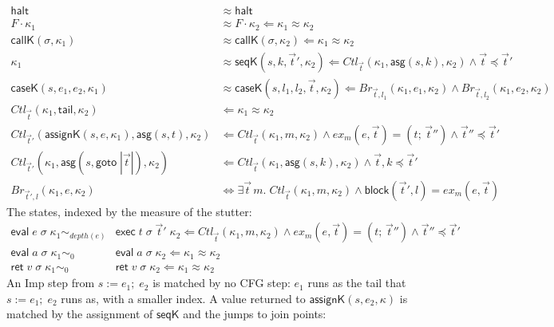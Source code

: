 \documentclass[10pt]{article}
\theoremstyle{acmplain}
\newcommand{\key}[1]{\mathsf{#1}}
\newcommand{\pass}[1]{\mathit{#1}}
\newcommand{\Kf}[2]{\key{#1}(#2)}
\newcommand{\halt}{\key{halt}}
\newcommand{\assign}[3]{#1 \mathrel{:=} #2;\; #3}
\newcommand{\evi}[3]{\key{eval}\;#1\;#2\;#3}
\newcommand{\rti}[3]{\key{ret}\;#1\;#2\;#3}
\newcommand{\exc}[4]{\key{exec}\;#1\;#2\;#3\;#4}
\begin{document}
\begin{align*}
  \halt &\approx \halt \\
  F \cdot \kappa_1 &\approx F \cdot \kappa_2 \Leftarrow \kappa_1 \approx \kappa_2 \\
  \Kf{callK}{\sigma, \kappa_1} &\approx \Kf{callK}{\sigma, \kappa_2} \Leftarrow \kappa_1 \approx \kappa_2 \\
  \kappa_1 &\approx \Kf{seqK}{s, k, \vec{t}', \kappa_2} \Leftarrow
    \mathit{Ctl}_{\vec{t}}(\kappa_1, \key{asg}(s, k), \kappa_2) \land \vec{t} \preceq \vec{t}' \\
  \Kf{caseK}{s, e_1, e_2, \kappa_1} &\approx \Kf{caseK}{s, l_1, l_2, \vec{t}, \kappa_2} \Leftarrow
    \mathit{Br}_{\vec{t}, l_1}(\kappa_1, e_1, \kappa_2) \land \mathit{Br}_{\vec{t}, l_2}(\kappa_1, e_2, \kappa_2) \\[1ex]
  \mathit{Ctl}_{\vec{t}}(\kappa_1, \key{tail}, \kappa_2) &\Leftarrow \kappa_1 \approx \kappa_2 \\
  \mathit{Ctl}_{\vec{t}'}(\Kf{assignK}{s, e, \kappa_1}, \key{asg}(s, t), \kappa_2) &\Leftarrow
    \mathit{Ctl}_{\vec{t}}(\kappa_1, m, \kappa_2) \land \pass{ex}_m(e, \vec{t}) = (t;\, \vec{t}'') \land \vec{t}'' \preceq \vec{t}' \\
  \mathit{Ctl}_{\vec{t}'}(\kappa_1, \key{asg}(s, \key{goto}\; |\vec{t}|), \kappa_2) &\Leftarrow
    \mathit{Ctl}_{\vec{t}}(\kappa_1, \key{asg}(s, k), \kappa_2) \land \vec{t}, k \preceq \vec{t}' \\[1ex]
  \mathit{Br}_{\vec{t}', l}(\kappa_1, e, \kappa_2) &\iff \exists \vec{t}\, m.\;
    \mathit{Ctl}_{\vec{t}}(\kappa_1, m, \kappa_2) \land \key{block}(\vec{t}', l) = \pass{ex}_m(e, \vec{t})
\end{align*}
The states, indexed by the measure of the stutter:
\begin{align*}
  \evi{e}{\sigma}{\kappa_1} \sim_{\mathit{depth}(e)} {}& \exc{t}{\sigma}{\vec{t}'}{\kappa_2}
    \Leftarrow \mathit{Ctl}_{\vec{t}}(\kappa_1, m, \kappa_2) \land \pass{ex}_m(e, \vec{t}) = (t;\, \vec{t}'')
      \land \vec{t}'' \preceq \vec{t}' \\
  \evi{a}{\sigma}{\kappa_1} \sim_0 {}& \evi{a}{\sigma}{\kappa_2} \Leftarrow \kappa_1 \approx \kappa_2 \\
  \rti{v}{\sigma}{\kappa_1} \sim_0 {}& \rti{v}{\sigma}{\kappa_2} \Leftarrow \kappa_1 \approx \kappa_2
\end{align*}
An Imp step from $\assign{s}{e_1}{e_2}$ is matched by no CFG step: $e_1$
runs as the tail that $\assign{s}{e_1}{e_2}$ runs as, with a smaller
index. A value returned to $\Kf{assignK}{s, e_2, \kappa}$ is matched by
the assignment of $\key{seqK}$ and the jumps to join points:
\end{document}
